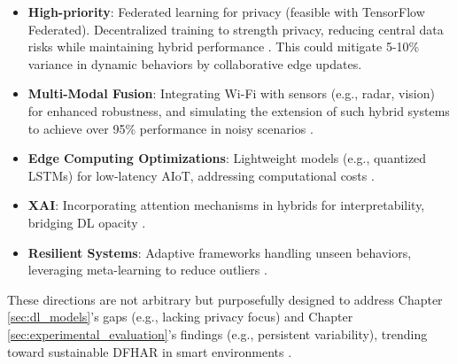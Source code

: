 \documentclass[Afour,sageh,times]{sagej}
\begin{document}
\begin{itemize}

\item \textbf{High-priority}: Federated learning for privacy (feasible with TensorFlow Federated). Decentralized training to strength privacy, reducing central data risks while maintaining hybrid performance \citep{ma2019wifi}. This could mitigate 5-10\% variance in dynamic behaviors by collaborative edge updates.
\item \textbf{Multi-Modal Fusion}: Integrating Wi-Fi with sensors (e.g., radar, vision) for enhanced robustness, and simulating the extension of such hybrid systems to achieve over 95\% performance in noisy scenarios \citep{wang2021multimodal}.
\item \textbf{Edge Computing Optimizations}: Lightweight models (e.g., quantized LSTMs) for low-latency AIoT, addressing computational costs \citep{yang2022deep}.
\item \textbf{XAI}: Incorporating attention mechanisms in hybrids for interpretability, bridging DL opacity \citep{chen2018wifi}.
\item \textbf{Resilient Systems}: Adaptive frameworks handling unseen behaviors, leveraging meta-learning to reduce outliers \citep{shen2022graph}.
\end{itemize}

These directions are not arbitrary but purposefully designed to address Chapter \ref{sec:dl_models}'s gaps (e.g., lacking privacy focus) and Chapter \ref{sec:experimental_evaluation}'s findings (e.g., persistent variability), trending toward sustainable DFHAR in smart environments \citep{Arshad:2022_har_review}.
\end{document}
